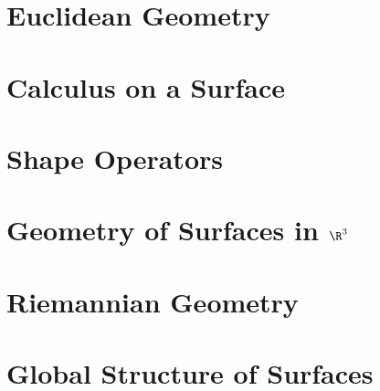 \newpage
\section{Euclidean Geometry}
\section{Calculus on a Surface}
\section{Shape Operators}
\section{Geometry of Surfaces in ${\R}^{3}$}
\section{Riemannian Geometry}
\section{Global Structure of Surfaces}